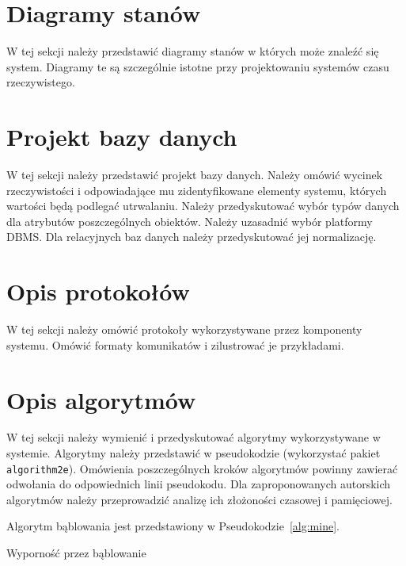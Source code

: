 \section{Diagramy stanów}

W tej sekcji należy przedstawić diagramy stanów w których może znaleźć się system. Diagramy te są szczególnie istotne przy projektowaniu systemów czasu rzeczywistego. 

\section{Projekt bazy danych}

W tej sekcji należy przedstawić projekt bazy danych. Należy omówić wycinek rzeczywistości i odpowiadające mu zidentyfikowane elementy systemu, których wartości będą podlegać utrwalaniu. Należy przedyskutować wybór typów danych dla atrybutów poszczególnych obiektów. Należy uzasadnić wybór platformy DBMS. Dla relacyjnych baz danych należy przedyskutować jej normalizację.

\section{Opis protokołów}

W tej sekcji należy omówić protokoły wykorzystywane przez komponenty systemu. Omówić formaty komunikatów i zilustrować je przykładami. 

\section{Opis algorytmów}

W tej sekcji należy wymienić i przedyskutować algorytmy wykorzystywane w systemie. Algorytmy należy przedstawić w pseudokodzie (wykorzystać pakiet \texttt{algorithm2e}). Omówienia poszczególnych kroków algorytmów powinny zawierać odwołania do odpowiednich linii pseudokodu. Dla zaproponowanych autorskich algorytmów należy przeprowadzić analizę ich złożoności czasowej i pamięciowej. 

{\color{dgray}
Algorytm bąblowania jest przedstawiony w Pseudokodzie~\ref{alg:mine}.
}

{\small
\begin{pseudokod}[H]
\caption{Wyporność przez bąblowanie}\label{alg:mine}
\end{pseudokod}
}

